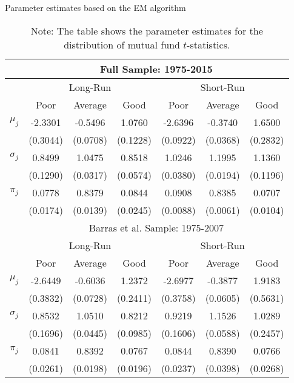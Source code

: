 \begin{table}[t]
\small
\centering
\captionsetup{labelsep=colon, font=footnotesize, justification=centerfirst}
\caption{Parameter estimates based on the EM algorithm}
\begin{tabular}{*{7}{c}}
\toprule
& \multicolumn{6}{c}{Full Sample: 1975-2015} \\
\midrule
& \multicolumn{3}{c}{Long-Run} & \multicolumn{3}{c}{Short-Run} \\
\cmidrule(l{2pt}r{2pt}){2-4} \cmidrule(l{2pt}r{2pt}){5-7}
& Poor & Average & Good & Poor & Average & Good \\
\midrule
$\mu_j$ & -2.3301 & -0.5496 & 1.0760 & -2.6396 & -0.3740 & 1.6500 \\
& (0.3044) & (0.0708) & (0.1228) & (0.0922) & (0.0368) & (0.2832) \\
$\sigma_j$ & 0.8499 & 1.0475 & 0.8518 & 1.0246 & 1.1995 & 1.1360 \\
& (0.1290) & (0.0317) & (0.0574) & (0.0380) & (0.0194) & (0.1196) \\
$\pi_j$ & 0.0778 & 0.8379 & 0.0844 & 0.0908 & 0.8385 & 0.0707 \\
& (0.0174) & (0.0139) & (0.0245) & (0.0088) & (0.0061) & (0.0104) \\
\midrule
& \multicolumn{6}{c}{Barras et al. Sample: 1975-2007} \\
\midrule
& \multicolumn{3}{c}{Long-Run} & \multicolumn{3}{c}{Short-Run} \\
\cmidrule(l{2pt}r{2pt}){2-4} \cmidrule(l{2pt}r{2pt}){5-7}
& Poor & Average & Good & Poor & Average & Good \\
\midrule
$\mu_j$ & -2.6449 & -0.6036 & 1.2372 & -2.6977 & -0.3877 & 1.9183 \\
& (0.3832) & (0.0728) & (0.2411) & (0.3758) & (0.0605) & (0.5631) \\
$\sigma_j$ & 0.8532 & 1.0510 & 0.8212 & 0.9219 & 1.1526 & 1.0289 \\
& (0.1696) & (0.0445) & (0.0985) & (0.1606) & (0.0588) & (0.2457) \\
$\pi_j$ & 0.0841 & 0.8392 & 0.0767 & 0.0844 & 0.8390 & 0.0766 \\
& (0.0261) & (0.0198) & (0.0196) & (0.0237) & (0.0398) & (0.0268) \\
\bottomrule
\end{tabular}
\captionsetup{position=below, font=footnotesize, justification=justified, width=0.62\linewidth}
\caption*{Note: The table shows the parameter estimates for the distribution of mutual fund $t$-statistics.}
\label{tab:main}
\end{table}

